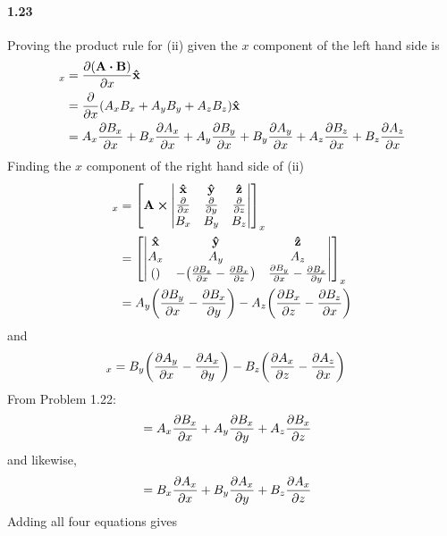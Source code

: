 \documentclass[../main.tex]{subfiles}
\begin{document}
\paragraph{1.23}
Proving the product rule for (ii) given the $x$ component of the left hand side is
\begin{align*}
    [\grad(\vb{A} \vdot \vb{B})]_x &= \pdv{(\vb{A} \vdot \vb{B})}{x} \vu{x} \\
    &= \pdv{x}(A_x B_x + A_y B_y + A_z B_z) \vu{x} \\
    &= A_x \pdv{B_x}{x} + B_x \pdv{A_x}{x} + A_y \pdv{B_y}{x} + B_y \pdv{A_y}{x}
        + A_z \pdv{B_z}{x} + B_z \pdv{A_z}{x} \\
\end{align*}
Finding the $x$ component of the right hand side of (ii)
\begin{align*}
    [\vb{A} \cp (\curl{\vb{B}})]_x &= \qt[\vb{A} \cp \begin{vmatrix}
        \vu{x} & \vu{y} & \vu{z} \\
        \pdv{x} & \pdv{y} & \pdv{z} \\
        B_x & B_y & B_z
    \end{vmatrix}]_x \\
    &= \qt[\begin{vmatrix}
        \vu{x} & \vu{y} & \vu{z} \\
        A_x & A_y & A_z \\
        () & -\qt(\pdv{B_z}{x} - \pdv{B_x}{z}) & \pdv{B_y}{x} - \pdv{B_x}{y}
    \end{vmatrix}]_x \\
    &= A_y \qt( \pdv{B_y}{x} - \pdv{B_x}{y})
        - A_z \qt(\pdv{B_x}{z} - \pdv{B_z}{x})
\end{align*}
and
\begin{align*}
    [\vb{B} \cp (\curl{\vb{A}})]_x &= B_y \qt(\pdv{A_y}{x} - \pdv{A_x}{y})
    - B_z \qt(\pdv{A_x}{z} - \pdv{A_z}{x})
\end{align*}
From Problem 1.22:
\begin{align*}
    [(\vb{A} \vdot \grad) \vb{B}] &= A_x \pdv{B_x}{x} + A_y \pdv{B_x}{y} + A_z \pdv{B_x}{z}
\end{align*}
and likewise,
\begin{align*}
    [(\vb{B} \vdot \grad) \vb{A}] &= B_x \pdv{A_x}{x} + B_y \pdv{A_x}{y} + B_z \pdv{A_x}{z}
\end{align*}
Adding all four equations gives
\end{document}
